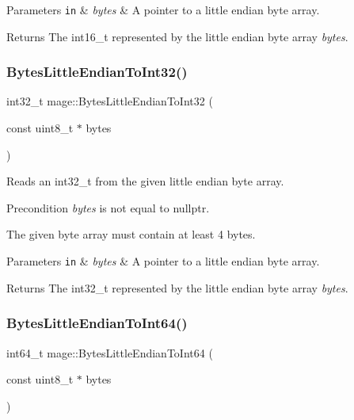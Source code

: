 \begin{DoxyParams}[1]{Parameters}
\mbox{\tt in}  & {\em bytes} & A pointer to a little endian byte array. \\
\hline
\end{DoxyParams}
\begin{DoxyReturn}{Returns}
The {\ttfamily int16\+\_\+t} represented by the little endian byte array {\itshape bytes}. 
\end{DoxyReturn}
\hypertarget{namespacemage_ad3cd4209c8a542d2196091a4753a58b3}{}\label{namespacemage_ad3cd4209c8a542d2196091a4753a58b3} 
\subsubsection{\texorpdfstring{Bytes\+Little\+Endian\+To\+Int32()}{BytesLittleEndianToInt32()}}
{\footnotesize\ttfamily int32\+\_\+t mage\+::\+Bytes\+Little\+Endian\+To\+Int32 (\begin{DoxyParamCaption}\item[{const uint8\+\_\+t $\ast$}]{bytes }\end{DoxyParamCaption})}

Reads an int32\+\_\+t from the given little endian byte array.

\begin{DoxyPrecond}{Precondition}
{\itshape bytes} is not equal to {\ttfamily nullptr}. 

The given byte array must contain at least 4 bytes. 
\end{DoxyPrecond}

\begin{DoxyParams}[1]{Parameters}
\mbox{\tt in}  & {\em bytes} & A pointer to a little endian byte array. \\
\hline
\end{DoxyParams}
\begin{DoxyReturn}{Returns}
The {\ttfamily int32\+\_\+t} represented by the little endian byte array {\itshape bytes}. 
\end{DoxyReturn}
\hypertarget{namespacemage_ae242f13f851ffa9c73bdcb17902f6b57}{}\label{namespacemage_ae242f13f851ffa9c73bdcb17902f6b57} 
\subsubsection{\texorpdfstring{Bytes\+Little\+Endian\+To\+Int64()}{BytesLittleEndianToInt64()}}
{\footnotesize\ttfamily int64\+\_\+t mage\+::\+Bytes\+Little\+Endian\+To\+Int64 (\begin{DoxyParamCaption}\item[{const uint8\+\_\+t $\ast$}]{bytes }\end{DoxyParamCaption})}

